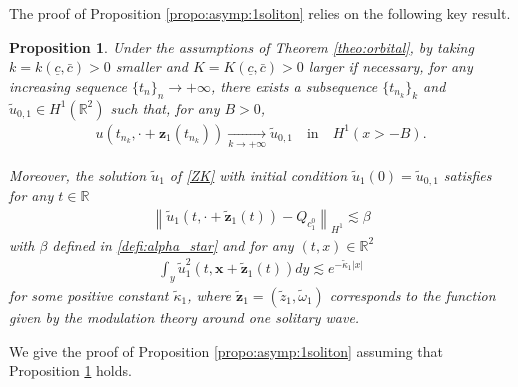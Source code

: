 \documentclass[reqno,10pt]{amsart}
\newtheorem{propo}[lemm]{Proposition}
\numberwithin{equation}{section}
\newcommand{\bx}{\mathbf{x}}
\newcommand{\bz}{\mathbf{z}}
\begin{document}
The proof of Proposition \ref{propo:asymp:1soliton} relies on the following key result. 


	\begin{propo}\label{propo:limit_object_1}
		 Under the assumptions of Theorem \ref{theo:orbital}, by taking $k=k(\underline{c},\bar{c})>0$ smaller and $K=K(\underline{c},\bar{c})>0$ larger if necessary, for any increasing sequence $\{t_n\}_n\rightarrow +\infty$, there exists a subsequence $\{t_{n_k}\}_k$ and $\tilde{u}_{0,1}\in H^1(\mathbb{R}^2)$ such that, for any $B>0$,
		\begin{align*}
			u \left( t_{n_k}, \cdot + \bz_1(t_{n_k}) \right) \underset{k\rightarrow +\infty}{\rightarrow} \tilde{u}_{0,1} \quad \text{in} \quad H^1(x >-B).
		\end{align*}
		
		Moreover, the solution $\tilde{u}_1$ of \ref{ZK} with initial condition $\tilde{u}_1(0)= \tilde{u}_{0,1}$ satisfies for any $t \in \mathbb{R}$
		\begin{align}\label{eq:u_tilde1_bound}
			\left\| \tilde{u}_1 \left(t,\cdot + \tilde{\bz}_1(t) \right) - Q_{c_1^0} \right\|_{H^1} \lesssim \beta
		\end{align}
		with $\beta$ defined in \eqref{defi:alpha_star} and for any $(t,x)\in \mathbb{R}^2$
		\begin{align}\label{eq:u_tilde1_decay}
			\int_y \tilde{u}_1^2 \left( t, \bx + \tilde{\bz}_1(t) \right) dy \lesssim e^{-\tilde{\kappa}_1 \vert x \vert}
		\end{align}
		for some positive constant $\tilde{\kappa}_1$, where $\tilde{\bz}_1=\left( \tilde{z}_1,\tilde{\omega}_1\right)$ corresponds to the function given by the modulation theory around one solitary wave. 
	\end{propo}


	
	We give the proof of Proposition \ref{propo:asymp:1soliton} assuming that Proposition \ref{propo:limit_object_1} holds. 
 
\end{document}
